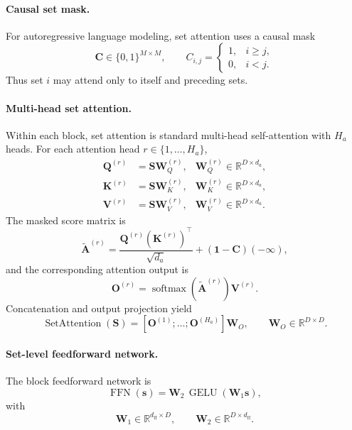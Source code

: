 \documentclass{article}
\theoremstyle{plain}
\theoremstyle{definition}
\theoremstyle{remark}
\begin{document}
\paragraph{Causal set mask.}
For autoregressive language modeling, set attention uses a causal mask
\begin{equation}
\label{eq:causal-mask}
\mathbf C\in\{0,1\}^{M\times M},
\qquad
C_{i,j}=
\begin{cases}
1,& i\ge j,\\
0,& i<j.
\end{cases}
\end{equation}
Thus set $i$ may attend only to itself and preceding sets.

\paragraph{Multi-head set attention.}
Within each block, set attention is standard multi-head self-attention with $H_a$ heads. For each attention head $r\in\{1,\dots,H_a\}$,
\begin{align}
\label{eq:qkv-projections}
\mathbf Q^{(r)} &= \mathbf S\mathbf W_Q^{(r)},
&\mathbf W_Q^{(r)}\in\mathbb R^{D\times d_a},\\
\mathbf K^{(r)} &= \mathbf S\mathbf W_K^{(r)},
&\mathbf W_K^{(r)}\in\mathbb R^{D\times d_a},\\
\mathbf V^{(r)} &= \mathbf S\mathbf W_V^{(r)},
&\mathbf W_V^{(r)}\in\mathbb R^{D\times d_a}.
\end{align}
The masked score matrix is
\begin{equation}
\label{eq:attention-scores}
\widetilde{\mathbf A}^{(r)}
=
\frac{\mathbf Q^{(r)}(\mathbf K^{(r)})^\top}{\sqrt{d_a}}
+ (\mathbf 1-\mathbf C)(-\infty),
\end{equation}
and the corresponding attention output is
\begin{equation}
\label{eq:attention-output}
\mathbf O^{(r)}=\operatorname{softmax}(\widetilde{\mathbf A}^{(r)})\mathbf V^{(r)}.
\end{equation}
Concatenation and output projection yield
\begin{equation}
\label{eq:multihead-concat}
\operatorname{SetAttention}(\mathbf S)
=
[\mathbf O^{(1)};\dots;\mathbf O^{(H_a)}]\mathbf W_O,
\qquad
\mathbf W_O\in\mathbb R^{D\times D}.
\end{equation}

\paragraph{Set-level feedforward network.}
The block feedforward network is
\begin{equation}
\label{eq:ffn}
\operatorname{FFN}(\mathbf s)=\mathbf W_2\,\operatorname{GELU}(\mathbf W_1\mathbf s),
\end{equation}
with
\begin{equation}
\mathbf W_1\in\mathbb R^{d_{\mathrm{ff}}\times D},
\qquad
\mathbf W_2\in\mathbb R^{D\times d_{\mathrm{ff}}}.
\end{equation}
\end{document}
